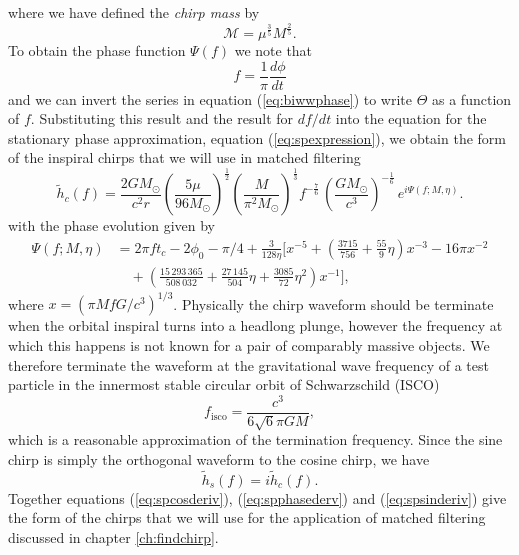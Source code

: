 where we have defined the \emph{chirp mass} by
\begin{equation}
\mathcal{M} = \mu^\frac{3}{5} M^\frac{2}{5}.
\end{equation}
To obtain the phase function $\Psi(f)$ we note that
\begin{equation}
f = \frac{1}{\pi} \frac{d\phi}{dt}
\end{equation}
and we can invert the series in equation (\ref{eq:biwwphase}) to write
$\Theta$ as a function of $f$. Substituting this result and the result for
$df/dt$ into the equation for the stationary phase approximation, equation
(\ref{eq:spexpression}), we obtain the form of the inspiral chirps that we
will use in matched filtering
\begin{equation}
\label{eq:spcosderiv}
\tilde{h}_c(f)=\frac{2GM_\odot}{c^2 r}
\left(\frac{5\mu}{96M_\odot}\right)^\frac{1}{2}
\left(\frac{M}{\pi^2M_\odot}\right)^\frac{1}{3}
f^{-\frac{7}{6}}\, \left( \frac{GM_\odot}{c^3} \right)^{-\frac{1}{6}}\,
e^{i\Psi(f;M,\eta)}.
\end{equation}
with the phase evolution given by
\begin{equation}
\begin{split}
\Psi(f;M,\eta) &= 2\pi ft_c-2\phi_0-\pi/4+\frac{3}{128\eta}\biggl[x^{-5}+
\left(\frac{3715}{756}+\frac{55}{9}\eta\right)x^{-3}
-16\pi x^{-2} \\
&\quad +\left(\frac{15\,293\,365}{508\,032}+\frac{27\,145}{504}\eta
+\frac{3085}{72}\eta^2\right)x^{-1}\biggr],
\label{eq:spphasederv}
\end{split}
\end{equation}
where $x=(\pi M f G/c^3)^{1/3}$. Physically the chirp waveform should be
terminate when the orbital inspiral turns into a headlong plunge, however the
frequency at which this happens is not known for a pair of comparably massive
objects. We therefore terminate the waveform at the gravitational wave
frequency of a test particle in the innermost stable circular orbit of
Schwarzschild (ISCO)\cite{Wald:1984}
\begin{equation}
f_\mathrm{isco} = \frac{c^3}{6\sqrt{6}\pi GM},
\end{equation}
which is a reasonable approximation of the termination
frequency\cite{Droz:1999qx}. Since the sine chirp is simply the orthogonal
waveform to the cosine chirp, we have
\begin{equation}
\tilde{h}_s(f)=i\tilde{h}_c(f).
\label{eq:spsinderiv}
\end{equation}
Together equations (\ref{eq:spcosderiv}), (\ref{eq:spphasederv}) and
(\ref{eq:spsinderiv}) give the form of the chirps that we will use for the
application of matched filtering discussed in chapter \ref{ch:findchirp}.

